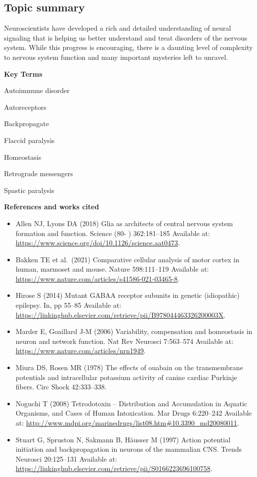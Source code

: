\documentclass[
]{book}
\begin{document}
\begin{itemize}
\end{itemize}

\hypertarget{topic-summary-4}{%
\subsection{Topic summary}\label{topic-summary-4}}

Neuroscientists have developed a rich and detailed understanding of neural signaling that is helping us better understand and treat disorders of the nervous system. While this progress is encouraging, there is a daunting level of complexity to nervous system function and many important mysteries left to unravel.

\textbf{Key Terms}

Autoimmune disorder

Autoreceptors

Backpropagate

Flaccid paralysis

Homeostasis

Retrograde messengers

Spastic paralysis

\textbf{References and works cited}

\begin{itemize}
\item
  Allen NJ, Lyons DA (2018) Glia as architects of central nervous system formation and function. Science (80- ) 362:181--185 Available at: \url{https://www.science.org/doi/10.1126/science.aat0473}.
\item
  Bakken TE et al.~(2021) Comparative cellular analysis of motor cortex in human, marmoset and mouse. Nature 598:111--119 Available at: \url{https://www.nature.com/articles/s41586-021-03465-8}.
\item
  Hirose S (2014) Mutant GABAA receptor subunits in genetic (idiopathic) epilepsy. In, pp 55--85 Available at: \url{https://linkinghub.elsevier.com/retrieve/pii/B978044463326200003X}.
\item
  Marder E, Goaillard J-M (2006) Variability, compensation and homeostasis in neuron and network function. Nat Rev Neurosci 7:563--574 Available at: \url{https://www.nature.com/articles/nrn1949}.
\item
  Miura DS, Rosen MR (1978) The effects of ouabain on the transmembrane potentials and intracellular potassium activity of canine cardiac Purkinje fibers. Circ Shock 42:333--338.
\item
  Noguchi T (2008) Tetrodotoxin -- Distribution and Accumulation in Aquatic Organisms, and Cases of Human Intoxication. Mar Drugs 6:220--242 Available at: \url{http://www.mdpi.org/marinedrugs/list08.htm\#10.3390_md20080011}.
\item
  Stuart G, Spruston N, Sakmann B, Häusser M (1997) Action potential initiation and backpropagation in neurons of the mammalian CNS. Trends Neurosci 20:125--131 Available at: \url{https://linkinghub.elsevier.com/retrieve/pii/S0166223696100758}.
\end{itemize}

  
\end{document}
